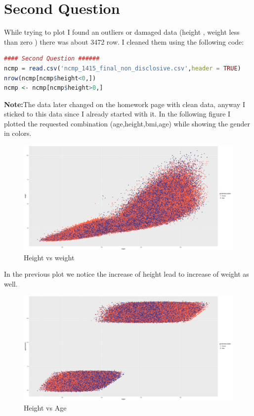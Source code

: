 \documentclass{article}
\begin{document}
	\section*{Second Question}
While trying to plot I found an outliers or damaged data (height , weight less than zero ) there was about 3472 row. I cleaned them using the following code:
\begin{lstlisting}[language=R]
#### Second Question ######
ncmp = read.csv('ncmp_1415_final_non_disclosive.csv',header = TRUE)
nrow(ncmp[ncmp$height<0,])
ncmp <- ncmp[ncmp$height>0,]
\end{lstlisting}
\textbf{Note:}The data later changed on the homework page with clean data, anyway I sticked to this data since I already started with it.
In the following figure I plotted the requested combination (age,height,bmi,age) while showing the gender in colors.
\begin{figure}[H]
\begin{center}
\includegraphics[scale=0.3]{heightweightgender.png}
\end{center}
\caption{Height vs weight}
\end{figure}
In the previous plot we notice the increase of height lead to increase of weight as well.
\begin{figure}[H]
	\begin{center}
		\includegraphics[scale=0.3]{heightage.png}
	\end{center}
	\caption{Height vs Age}
\end{figure}
\end{document}
